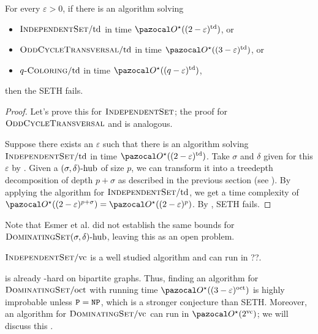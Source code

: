 \begin{corollary}
    \label{corollary:td-lowerbounds}
    For every $\varepsilon > 0$, if there is an algorithm solving
    \begin{itemize}
        \item $\textsc{IndependentSet}/\text{td}$ in time $\O^\star((2 - \varepsilon)^\td)$, or
        \item $\textsc{OddCycleTransversal}/\text{td}$ in time $\O^\star((3 - \varepsilon)^\td)$, or
        \item $q\textsc{-Coloring}/\text{td}$ in time $\O^\star((q - \varepsilon)^\td)$,
    \end{itemize}
    then the SETH fails.
\end{corollary}

\begin{proof}
    Let's prove this for $\textsc{IndependentSet}$; the proof for $\textsc{OddCycleTransversal}$ and  is analogous.

    Suppose there exists an $\varepsilon$ such that there is an algorithm solving $\textsc{IndependentSet}/\text{td}$ in time $\O^\star((2 - \varepsilon)^\td)$. Take $\sigma$ and $\delta$ given for this $\varepsilon$ by . Given a $(\sigma, \delta)\text{-hub}$ of size $p$, we can transform it into a treedepth decomposition of depth $p + \sigma$ as described in the previous section (see ). By applying the algorithm for $\textsc{IndependentSet}/\text{td}$, we get a time complexity of $\O^\star((2 - \varepsilon)^{p + \sigma}) = \O^\star((2 - \varepsilon)^p)$. By , SETH fails.
\end{proof}

Note that Esmer et al. did not establish the same bounds for $\textsc{DominatingSet}(\sigma, \delta)\text{-hub}$, leaving this as an open problem.

\medskip

$\textsc{IndependentSet}/\text{vc}$ is a well studied algorithm and can run in ??.

\medskip

 is already \NP-hard on bipartite graphs. Thus, finding an algorithm for $\textsc{DominatingSet}/\text{oct}$  with running time $\O^\star((3-\varepsilon)^\oct)$ is highly improbable unless $\texttt{P} = \texttt{NP}$, which is a stronger conjecture than SETH. Moreover, an algorithm for $\textsc{DominatingSet}/\text{vc}$ can run in $\O^\star(2^\vc)$; we will discuss this .

